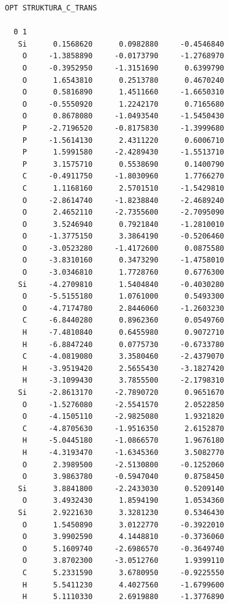 \documentclass[
  digital, %
  table,   %
  lof,     %
  lot,     %
  oneside,
]{fithesis3}
\begin{document}
  \begin{lstlisting}[frame=single, caption={puvodni struktura C trans },label=DescriptiveLabel]
  OPT STRUKTURA_C_TRANS

  0 1
   Si      0.1568620      0.0982880     -0.4546840
    O     -1.3858890     -0.0173790     -1.2768970
    O     -0.3952950     -1.3151690      0.6399790
    O      1.6543810      0.2513780      0.4670240
    O      0.5816890      1.4511660     -1.6650310
    O     -0.5550920      1.2242170      0.7165680
    O      0.8678080     -1.0493540     -1.5450430
    P     -2.7196520     -0.8175830     -1.3999680
    P     -1.5614130      2.4311220      0.6006710
    P      1.5991580     -2.4289430     -1.5513710
    P      3.1575710      0.5538690      0.1400790
    C     -0.4911750     -1.8030960      1.7766270
    C      1.1168160      2.5701510     -1.5429810
    O     -2.8614740     -1.8238840     -2.4689240
    O      2.4652110     -2.7355600     -2.7095090
    O      3.5246940      0.7921840     -1.2810010
    O     -1.3775150      3.3864190     -0.5206460
    O     -3.0523280     -1.4172600      0.0875580
    O     -3.8310160      0.3473290     -1.4758010
    O     -3.0346810      1.7728760      0.6776300
   Si     -4.2709810      1.5404840     -0.4030280
    O     -5.5155180      1.0761000      0.5493300
    O     -4.7174780      2.8446060     -1.2603230
    C     -6.8440280      0.8962360      0.0549760
    H     -7.4810840      0.6455980      0.9072710
    H     -6.8847240      0.0775730     -0.6733780
    C     -4.0819080      3.3580460     -2.4379070
    H     -3.9519420      2.5655430     -3.1827420
    H     -3.1099430      3.7855500     -2.1798310
   Si     -2.8613170     -2.7890720      0.9651670
    O     -1.5276080     -2.5541570      2.0522850
    O     -4.1505110     -2.9825080      1.9321820
    C     -4.8705630     -1.9516350      2.6152870
    H     -5.0445180     -1.0866570      1.9676180
    H     -4.3193470     -1.6345360      3.5082770
    O      2.3989500     -2.5130800     -0.1252060
    O      3.9863780     -0.5947040      0.8758450
   Si      3.8841800     -2.2433030      0.5209140
    O      3.4932430      1.8594190      1.0534360
   Si      2.9221630      3.3281230      0.5346430
    O      1.5450890      3.0122770     -0.3922010
    O      3.9902590      4.1448810     -0.3736060
    O      5.1609740     -2.6986570     -0.3649740
    O      3.8702300     -3.0512760      1.9399110
    C      5.2331590      3.6780950     -0.9225550
    H      5.5411230      4.4027560     -1.6799600
    H      5.1110330      2.6919880     -1.3776890

\end{lstlisting}
\end{document}
